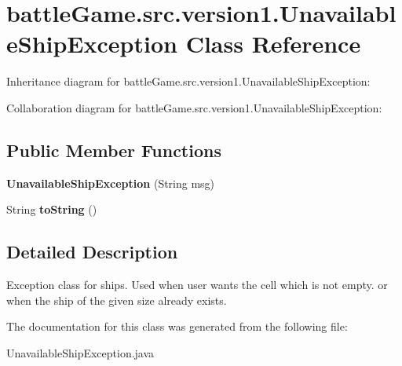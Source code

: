 \hypertarget{classbattleGame_1_1src_1_1version1_1_1UnavailableShipException}{}\section{battle\+Game.\+src.\+version1.\+Unavailable\+Ship\+Exception Class Reference}
\label{classbattleGame_1_1src_1_1version1_1_1UnavailableShipException}


Inheritance diagram for battle\+Game.\+src.\+version1.\+Unavailable\+Ship\+Exception\+:


Collaboration diagram for battle\+Game.\+src.\+version1.\+Unavailable\+Ship\+Exception\+:
\subsection*{Public Member Functions}
\begin{DoxyCompactItemize}
\item 
{\bfseries Unavailable\+Ship\+Exception} (String msg)\hypertarget{classbattleGame_1_1src_1_1version1_1_1UnavailableShipException_a25e8df65b0bed4eeb8b1821a1feffa16}{}\label{classbattleGame_1_1src_1_1version1_1_1UnavailableShipException_a25e8df65b0bed4eeb8b1821a1feffa16}

\item 
String {\bfseries to\+String} ()\hypertarget{classbattleGame_1_1src_1_1version1_1_1UnavailableShipException_af58271b699f08c97bf5105ceeac768c1}{}\label{classbattleGame_1_1src_1_1version1_1_1UnavailableShipException_af58271b699f08c97bf5105ceeac768c1}

\end{DoxyCompactItemize}


\subsection{Detailed Description}
Exception class for ships. Used when user wants the cell which is not empty. or when the ship of the given size already exists. 

The documentation for this class was generated from the following file\+:\begin{DoxyCompactItemize}
\item 
Unavailable\+Ship\+Exception.\+java\end{DoxyCompactItemize}

